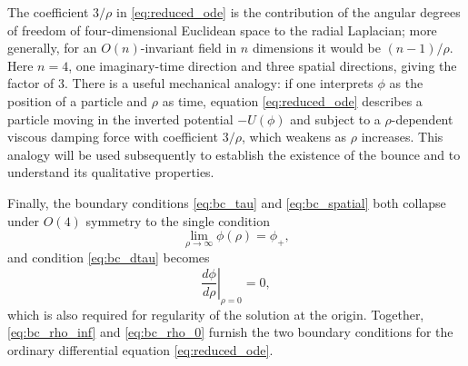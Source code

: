 The coefficient $3/\rho$ in \eqref{eq:reduced_ode} is the contribution
of the angular degrees of freedom of four-dimensional Euclidean space to
the radial Laplacian; more generally, for an $O(n)$-invariant field in
$n$ dimensions it would be $(n-1)/\rho$. Here $n=4$, one imaginary-time
direction and three spatial directions, giving the factor of $3$. There
is a useful mechanical analogy: if one interprets $\phi$ as the position
of a particle and $\rho$ as time, equation \eqref{eq:reduced_ode}
describes a particle moving in the inverted potential $-U(\phi)$ and
subject to a $\rho$-dependent viscous damping force with coefficient
$3/\rho$, which weakens as $\rho$ increases. This analogy will be used
subsequently to establish the existence of the bounce and to understand
its qualitative properties.

Finally, the boundary conditions \eqref{eq:bc_tau} and
\eqref{eq:bc_spatial} both collapse under $O(4)$ symmetry to the single
condition
\begin{equation}
    \lim_{\rho\to\infty}\phi(\rho)=\phi_{+},
    \label{eq:bc_rho_inf}
\end{equation}
and condition \eqref{eq:bc_dtau} becomes
\begin{equation}
    \left.\frac{d\phi}{d\rho}\right|_{\rho=0}=0,
    \label{eq:bc_rho_0}
\end{equation}
which is also required for regularity of the solution at the origin.
Together, \eqref{eq:bc_rho_inf} and \eqref{eq:bc_rho_0} furnish the two
boundary conditions for the ordinary differential equation
\eqref{eq:reduced_ode}.

